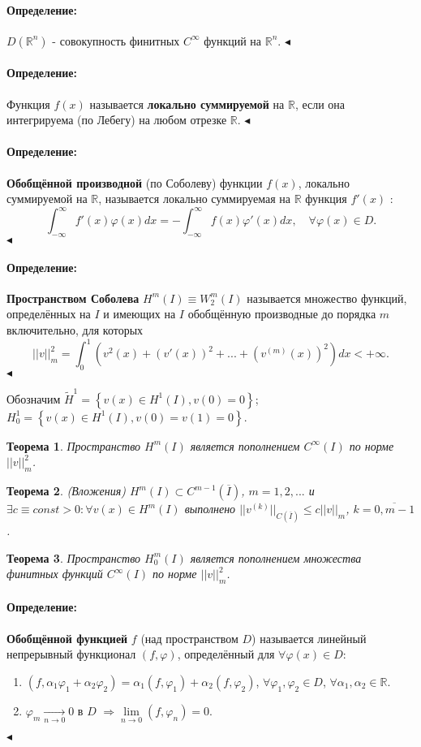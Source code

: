 \documentclass{article}
\newtheorem{theorem}{Теорема}
\newenvironment{definition}{ \paragraph{Определение:}}{\hfill $\blacktriangleleft$}
\begin{document}
\begin{definition}
	$D(\mathbb{R}^n)$ - совокупность финитных $C^{\infty}$ функций на $\mathbb{R}^n$.
\end{definition}

\begin{definition}
	Функция $f(x)$ называется \textbf{локально суммируемой} на $\mathbb{R}$, если она интегрируема (по Лебегу) на любом отрезке $\mathbb{R}$.
\end{definition}

\begin{definition}
	\textbf{Обобщённой производной} (по Соболеву)  функции $f(x)$, локально суммируемой на $\mathbb{R}$, называется локально суммируемая на $\mathbb{R}$ функция $f'(x)$ :
	\[
	\int_{-\infty}^{\infty} f'(x) \varphi(x) dx = - \int_{-\infty}^{\infty} f(x) \varphi'(x) dx, \quad \forall \varphi(x) \in D.
	\]
\end{definition}

\begin{definition}
	\textbf{Пространством Соболева} $H^m(I) \equiv W_2^m(I)$ называется множество функций, определённых на $I$ и имеющих на $I$ обобщённую производные до порядка $m$ включительно, для которых 
	\[
	||v||_m^2 = \int_0^1 \left( v^2(x) + (v'(x))^2 + ... + (v^{(m)}(x))^2 \right) dx < + \infty.	
	\]
\end{definition}

Обозначим 
$\tilde{H}^1 = \left\lbrace v(x) \in H^1(I), v(0) = 0 \right\rbrace$; 
$H_0^1 =  \left\lbrace v(x) \in H^1(I), v(0) = v(1) = 0 \right\rbrace$.

\begin{theorem}
	Пространство $H^m(I)$ является пополнением $C^{\infty}(I)$ по норме $||v||_m^2$.
\end{theorem}

\begin{theorem}
	(Вложения)
	$H^m(I) \subset C^{m-1}(\overline{I})$, $m = 1,2,...$ и $\exists c \equiv const > 0: \forall v(x) \in H^m(I)$ выполнено $||v^{(k)}||_{C(\overline{I})} \leqslant c ||v||_m$, $k = \overline{0,m-1}$. 
\end{theorem}

\begin{theorem}
	Пространство $H_0^m(I)$ является пополнением множества финитных функций $C^{\infty}(I)$ по норме $||v||_m^2$.
\end{theorem}

\begin{definition}
	\textbf{Обобщённой функцией} $f$ (над пространством $D$) называется линейный непрерывный функционал $(f,\varphi)$, определённый для $\forall \varphi(x) \in D$:
	\begin{enumerate}
	\item $(f, \alpha_1 \varphi_1 + \alpha_2 \varphi_2) = \alpha_1 (f,\varphi_1) + \alpha_2 (f,\varphi_2)$, $\forall \varphi_1, \varphi_2 \in D$, $\forall \alpha_1, \alpha_2 \in \mathbb{R}$.
	\item $\varphi_m \xrightarrow[n \rightarrow 0]{} 0$ в $D$ $\Rightarrow \lim\limits_{n \to 0} (f,\varphi_n) = 0$.
	\end{enumerate}
\end{definition}
\end{document}
